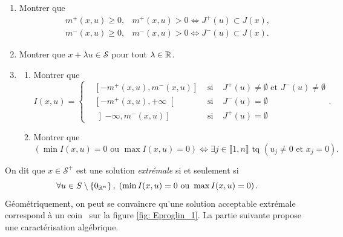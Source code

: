 \begin{enumerate}
  \item Montrer que 
\[
  \begin{aligned}
    &m^+(x,u) \geq 0, &m^+(x,u) > 0 \Leftrightarrow J^+(u)  \subset J(x), \\ 
    &m^-(x,u) \geq 0, &m^-(x,u) > 0 \Leftrightarrow J^-(u)  \subset J(x).
  \end{aligned}
\]

  \item Montrer que $x + \lambda u \in \mathcal{S}$ pour tout $\lambda \in \mathbb{R}$.
  \item 
  \begin{enumerate}
    \item Montrer que 
\[
  I(x,u) =
  \left\lbrace
  \begin{aligned}
    &\left[ -m^+(x,u), m^-(x,u)\right] &\text{ si }& J^+(u)\neq \emptyset \text{ et } J^-(u)\neq \emptyset \\
    &\left[ -m^+(x,u), +\infty\right[ &\text{ si }&  J^-(u) = \emptyset \\
    &\left] -\infty, m^-(x,u)\right] &\text{ si }& J^+(u) = \emptyset 
  \end{aligned}
  \right. .
\]
    \item Montrer que 
\[
  \left( \min I(x,u) = 0 \text{ ou } \max I(x,u) = 0\right)
  \Leftrightarrow
  \exists j \in \llbracket 1,n \rrbracket \text{ tq } \left( u_j \neq 0 \text{ et } x_j = 0\right).
\]

         \end{enumerate}
\end{enumerate}
On dit que $x \in \mathcal{S}^+$ est une solution \emph{extrémale} si et seulement si
\[
  \forall u \in S\setminus \left\lbrace 0_{\mathbb{R}^n} \right\rbrace,\; \left( \min I(x,u) = 0 \text{ ou } \max I(x,u) = 0 \right). 
\]
Géométriquement, on peut se convaincre qu'une solution acceptable extrémale correspond à un \og coin\fg~ sur la figure \ref{fig: Eproglin_1}. La partie suivante propose une caractérisation algébrique.
\clearpage


